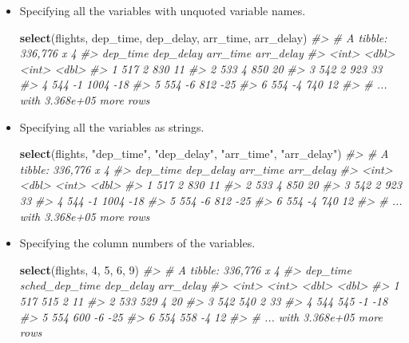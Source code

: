 \documentclass[]{book}
\newenvironment{Shaded}{\begin{snugshade}}{\end{snugshade}}
\newcommand{\CommentTok}[1]{\textcolor[rgb]{0.56,0.35,0.01}{\textit{#1}}}
\newcommand{\DecValTok}[1]{\textcolor[rgb]{0.00,0.00,0.81}{#1}}
\newcommand{\KeywordTok}[1]{\textcolor[rgb]{0.13,0.29,0.53}{\textbf{#1}}}
\newcommand{\NormalTok}[1]{#1}
\newcommand{\StringTok}[1]{\textcolor[rgb]{0.31,0.60,0.02}{#1}}
\theoremstyle{plain}
\theoremstyle{remark}
\begin{document}
\begin{itemize}
\item
  Specifying all the variables with unquoted variable names.

\begin{Shaded}
\begin{Highlighting}[]
\KeywordTok{select}\NormalTok{(flights, dep_time, dep_delay, arr_time, arr_delay)}
\CommentTok{#> # A tibble: 336,776 x 4}
\CommentTok{#>   dep_time dep_delay arr_time arr_delay}
\CommentTok{#>      <int>     <dbl>    <int>     <dbl>}
\CommentTok{#> 1      517         2      830        11}
\CommentTok{#> 2      533         4      850        20}
\CommentTok{#> 3      542         2      923        33}
\CommentTok{#> 4      544        -1     1004       -18}
\CommentTok{#> 5      554        -6      812       -25}
\CommentTok{#> 6      554        -4      740        12}
\CommentTok{#> # ... with 3.368e+05 more rows}
\end{Highlighting}
\end{Shaded}
\item
  Specifying all the variables as strings.

\begin{Shaded}
\begin{Highlighting}[]
\KeywordTok{select}\NormalTok{(flights, }\StringTok{"dep_time"}\NormalTok{, }\StringTok{"dep_delay"}\NormalTok{, }\StringTok{"arr_time"}\NormalTok{, }\StringTok{"arr_delay"}\NormalTok{)}
\CommentTok{#> # A tibble: 336,776 x 4}
\CommentTok{#>   dep_time dep_delay arr_time arr_delay}
\CommentTok{#>      <int>     <dbl>    <int>     <dbl>}
\CommentTok{#> 1      517         2      830        11}
\CommentTok{#> 2      533         4      850        20}
\CommentTok{#> 3      542         2      923        33}
\CommentTok{#> 4      544        -1     1004       -18}
\CommentTok{#> 5      554        -6      812       -25}
\CommentTok{#> 6      554        -4      740        12}
\CommentTok{#> # ... with 3.368e+05 more rows}
\end{Highlighting}
\end{Shaded}
\item
  Specifying the column numbers of the variables.

\begin{Shaded}
\begin{Highlighting}[]
\KeywordTok{select}\NormalTok{(flights, }\DecValTok{4}\NormalTok{, }\DecValTok{5}\NormalTok{, }\DecValTok{6}\NormalTok{, }\DecValTok{9}\NormalTok{)}
\CommentTok{#> # A tibble: 336,776 x 4}
\CommentTok{#>   dep_time sched_dep_time dep_delay arr_delay}
\CommentTok{#>      <int>          <int>     <dbl>     <dbl>}
\CommentTok{#> 1      517            515         2        11}
\CommentTok{#> 2      533            529         4        20}
\CommentTok{#> 3      542            540         2        33}
\CommentTok{#> 4      544            545        -1       -18}
\CommentTok{#> 5      554            600        -6       -25}
\CommentTok{#> 6      554            558        -4        12}
\CommentTok{#> # ... with 3.368e+05 more rows}
\end{Highlighting}
\end{Shaded}


\end{itemize}
\end{document}
